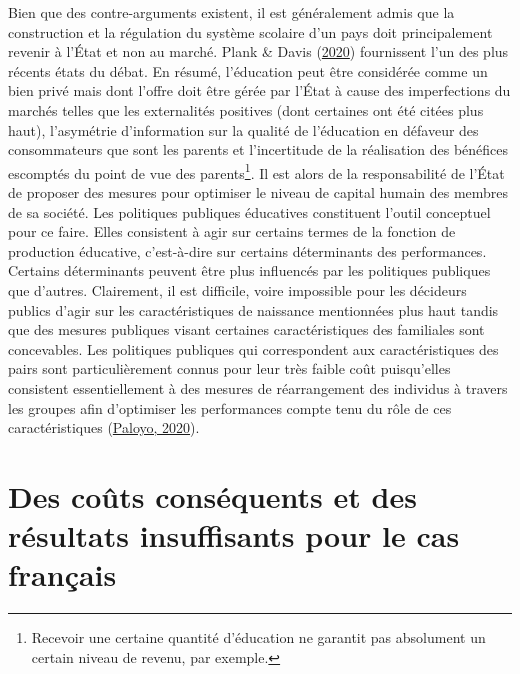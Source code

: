 \documentclass[
]{book}
\begin{document}
\quad Bien que des contre-arguments existent, il est généralement admis que la construction et la régulation du système scolaire d'un pays doit principalement revenir à l'État et non au marché. Plank \& Davis (\protect\hyperlink{ref-PLA:DAV:20}{2020}) fournissent l'un des plus récents états du débat. En résumé, l'éducation peut être considérée comme un bien privé mais dont l'offre doit être gérée par l'État à cause des imperfections du marchés telles que les externalités positives (dont certaines ont été citées plus haut), l'asymétrie d'information sur la qualité de l'éducation en défaveur des consommateurs que sont les parents et l'incertitude de la réalisation des bénéfices escomptés du point de vue des parents\footnote{Recevoir une certaine quantité d'éducation ne garantit pas absolument un certain niveau de revenu, par exemple.}. Il est alors de la responsabilité de l'État de proposer des mesures pour optimiser le niveau de capital humain des membres de sa société. Les politiques publiques éducatives constituent l'outil conceptuel pour ce faire. Elles consistent à agir sur certains termes de la fonction de production éducative, c'est-à-dire sur certains déterminants des performances.\\
Certains déterminants peuvent être plus influencés par les politiques publiques que d'autres. Clairement, il est difficile, voire impossible pour les décideurs publics d'agir sur les caractéristiques de naissance mentionnées plus haut tandis que des mesures publiques visant certaines caractéristiques des familiales sont concevables. Les politiques publiques qui correspondent aux caractéristiques des pairs sont particulièrement connus pour leur très faible coût puisqu'elles consistent essentiellement à des mesures de réarrangement des individus à travers les groupes afin d'optimiser les performances compte tenu du rôle de ces caractéristiques (\protect\hyperlink{ref-PAL:20}{Paloyo, 2020}).

\hypertarget{des-couxfbts-consuxe9quents-et-des-ruxe9sultats-insuffisants-pour-le-cas-franuxe7ais}{%
\section*{Des coûts conséquents et des résultats insuffisants pour le cas français}\label{des-couxfbts-consuxe9quents-et-des-ruxe9sultats-insuffisants-pour-le-cas-franuxe7ais}}
\end{document}

